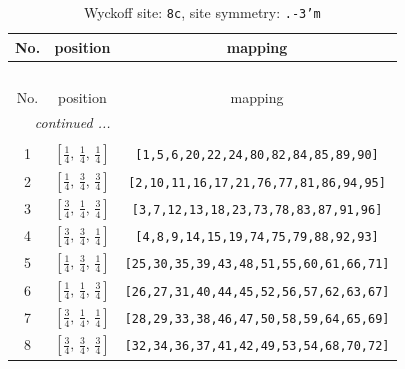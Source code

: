 \documentclass[fleqn,8pt]{jsarticle}
\begin{document}
\begin{longtable}{ccc}
\caption{Wyckoff site: {\tt 8c}, site symmetry: {\tt .-3'm}}
 \\
 \hline \hline
No. & position & mapping \\ \hline \endfirsthead

\multicolumn{2}{l}{\tablename\ \thetable{}} \\
 \hline \hline
No. & position & mapping \\ \hline \endhead

 \hline \hline
\multicolumn{2}{r}{\footnotesize\it continued ...} \\ \endfoot

 \hline \hline
\multicolumn{2}{r}{} \\ \endlastfoot

1 & $\left[ \frac{1}{4},\, \frac{1}{4},\, \frac{1}{4} \right]$ & {\tt [1,5,6,20,22,24,80,82,84,85,89,90]} \\ \hline
2 & $\left[ \frac{1}{4},\, \frac{3}{4},\, \frac{3}{4} \right]$ & {\tt [2,10,11,16,17,21,76,77,81,86,94,95]} \\ \hline
3 & $\left[ \frac{3}{4},\, \frac{1}{4},\, \frac{3}{4} \right]$ & {\tt [3,7,12,13,18,23,73,78,83,87,91,96]} \\ \hline
4 & $\left[ \frac{3}{4},\, \frac{3}{4},\, \frac{1}{4} \right]$ & {\tt [4,8,9,14,15,19,74,75,79,88,92,93]} \\ \hline
5 & $\left[ \frac{1}{4},\, \frac{3}{4},\, \frac{1}{4} \right]$ & {\tt [25,30,35,39,43,48,51,55,60,61,66,71]} \\ \hline
6 & $\left[ \frac{1}{4},\, \frac{1}{4},\, \frac{3}{4} \right]$ & {\tt [26,27,31,40,44,45,52,56,57,62,63,67]} \\ \hline
7 & $\left[ \frac{3}{4},\, \frac{1}{4},\, \frac{1}{4} \right]$ & {\tt [28,29,33,38,46,47,50,58,59,64,65,69]} \\ \hline
8 & $\left[ \frac{3}{4},\, \frac{3}{4},\, \frac{3}{4} \right]$ & {\tt [32,34,36,37,41,42,49,53,54,68,70,72]} \\
\end{longtable}
\renewcommand{\arraystretch}{1.2}
\end{document}
